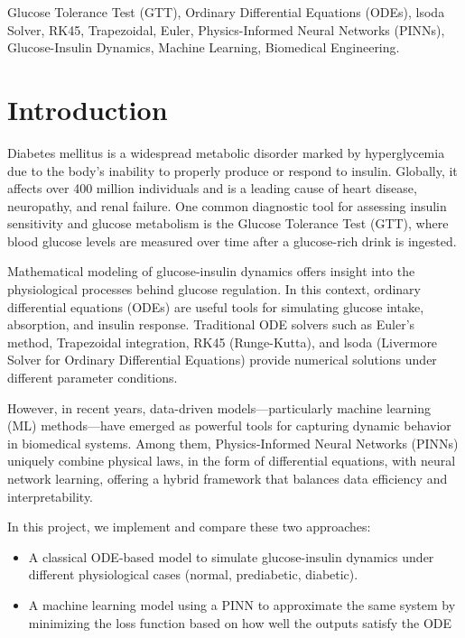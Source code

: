 \documentclass[conference]{IEEEtran}
\begin{document}
\begin{IEEEkeywords}
Glucose Tolerance Test (GTT), Ordinary Differential Equations (ODEs), lsoda Solver, RK45, Trapezoidal, Euler, Physics-Informed Neural Networks (PINNs), Glucose-Insulin Dynamics, Machine Learning, Biomedical Engineering.
\end{IEEEkeywords}

\section{Introduction}
Diabetes mellitus is a widespread metabolic disorder marked by hyperglycemia due to the body's inability to properly produce or respond to insulin. Globally, it affects over 400 million individuals and is a leading cause of heart disease, neuropathy, and renal failure. One common diagnostic tool for assessing insulin sensitivity and glucose metabolism is the Glucose Tolerance Test (GTT), where blood glucose levels are measured over time after a glucose-rich drink is ingested.

Mathematical modeling of glucose-insulin dynamics offers insight into the physiological processes behind glucose regulation. In this context, ordinary differential equations (ODEs) are useful tools for simulating glucose intake, absorption, and insulin response. Traditional ODE solvers such as Euler’s method, Trapezoidal integration, RK45 (Runge-Kutta), and lsoda (Livermore Solver for Ordinary Differential Equations) provide numerical solutions under different parameter conditions.

However, in recent years, data-driven models—particularly machine learning (ML) methods—have emerged as powerful tools for capturing dynamic behavior in biomedical systems. Among them, Physics-Informed Neural Networks (PINNs) uniquely combine physical laws, in the form of differential equations, with neural network learning, offering a hybrid framework that balances data efficiency and interpretability.

In this project, we implement and compare these two approaches:
\begin{itemize}
    \item A classical ODE-based model to simulate glucose-insulin dynamics under different physiological cases (normal, prediabetic, diabetic).
    \item A machine learning model using a PINN to approximate the same system by minimizing the loss function based on how well the outputs satisfy the ODE 
\end{itemize}
\end{document}
